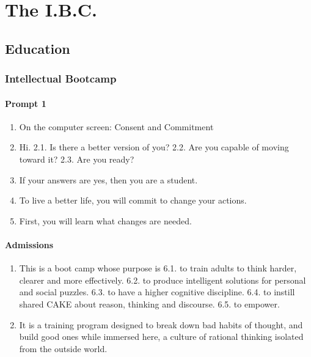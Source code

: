 \documentclass[
]{book}
\providecommand{\tightlist}{%
  \setlength{\itemsep}{0pt}\setlength{\parskip}{0pt}}
\begin{document}
\hypertarget{part-the-i.b.c.}{%
\part{The I.B.C.}\label{part-the-i.b.c.}}

\hypertarget{education}{%
\chapter{Education}\label{education}}

\hypertarget{intellectual-bootcamp}{%
\section{Intellectual Bootcamp}\label{intellectual-bootcamp}}

\hypertarget{prompt-1}{%
\subsection{Prompt 1}\label{prompt-1}}

\begin{enumerate}
\def\labelenumi{\arabic{enumi}.}
\tightlist
\item
  On the computer screen:
  Consent and Commitment
\item
  Hi.
  2.1. Is there a better version of you?
  2.2. Are you capable of moving toward it?
  2.3. Are you ready?
\item
  If your answers are yes, then you are a student.
\item
  To live a better life, you will commit to change your actions.
\item
  First, you will learn what changes are needed.
\end{enumerate}

\hypertarget{admissions}{%
\subsection{Admissions}\label{admissions}}

\begin{enumerate}
\def\labelenumi{\arabic{enumi}.}
\setcounter{enumi}{5}
\tightlist
\item
  This is a boot camp whose purpose is
  6.1. to train adults to think harder, clearer and more effectively.
  6.2. to produce intelligent solutions for personal and social puzzles.
  6.3. to have a higher cognitive discipline.
  6.4. to instill shared CAKE about reason, thinking and discourse.
  6.5. to empower.
\item
  It is a training program designed to break down bad habits of thought, and build
  good ones while immersed here, a culture of rational thinking isolated from the
  outside world.
\end{enumerate}
\end{document}
